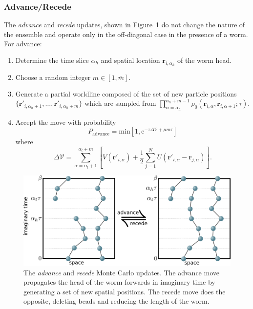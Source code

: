 \documentclass[prb,aps,amssym,nofootinbib,floatfix,notitlepage]{revtex4-1}
\renewcommand{\vec}[1]{\boldsymbol{#1}}
\newcommand{\e}[1]{\mathrm{e}^{#1}}
\begin{document}
\subsubsection{Advance/Recede}
The \emph{advance} and \emph{recede} updates, shown in
 Figure~\ref{fig:advancerecede} do not change the nature of the
ensemble and operate only in the off-diagonal case in the presence of a worm.
For advance:
\begin{enumerate}
    \item Determine the time slice $\alpha_h$ and spatial location
        $\vec{r}_{i,\alpha_h}$ of the worm head.
    \item Choose a random integer $m \in [1,\overline{m}]$.
    \item Generate a partial worldline composed of the set of new particle positions 
        $\{\vec{r}'_{i,\alpha_h+1},\ldots, \vec{r}'_{i,\alpha_h+m}\}$ which are
        sampled from $\prod_{\alpha=\alpha_h}^{\alpha_h+m-1}
    \rho_0(\vec{r}_{i,\alpha},\vec{r}_{i,\alpha+1};\tau)$.
\item Accept the move with probability
\begin{equation}
    P_{\text{advance}} = \mathrm{min} \left[1,
    \e{-\tau \Delta \mathcal{V} + \mu m \tau} \right]
\end{equation}
%
where
%
\begin{equation}
    \Delta\mathcal{V} = \sum_{\alpha=\alpha_t+1}^{\alpha_t+m} \left[ 
        V(\vec{r}'_{i,\alpha}) + \frac{1}{2}\sum_{j=1}^N
        U(\vec{r}'_{i,\alpha}-\vec{r}_{j,\alpha}) \right].
\end{equation}
%
\end{enumerate}

%
\begin{figure}
\begin{center}
\includegraphics[width=0.70\columnwidth]{Figures/advancerecede.pdf}
\end{center}
\caption{The \emph{advance} and \emph{recede} Monte Carlo updates.  The advance
    move propagates the head of the worm forwards in imaginary time by
    generating a set of new spatial positions.  The recede move does the
opposite, deleting beads and reducing the length of the worm.}
\label{fig:advancerecede}
 \end{figure}
%
\end{document}
